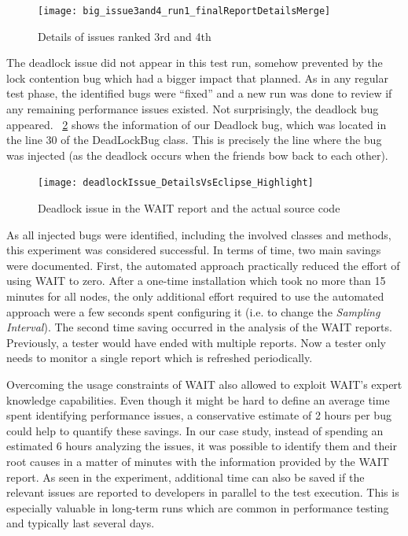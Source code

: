 \documentclass[runningheads,a4paper]{llncs}
\begin{document}
\begin{figure}[!h]
\centering
\texttt{[image: big\_issue3and4\_run1\_finalReportDetailsMerge]}
\caption{Details of issues ranked 3rd and 4th}
\label{fig_issues34}
\end{figure}

The deadlock issue did not appear in this test run, somehow prevented by the
lock contention bug which had a bigger impact that planned. As in any regular
test phase, the identified bugs were ``fixed'' and a new run was done to review
if any remaining performance issues existed. Not surprisingly, the deadlock bug
appeared. \figurename ~\ref{fig_dlissue_vs_code} shows the information of our
Deadlock bug, which was located in the line 30 of the DeadLockBug class. This is
precisely the line where the bug was injected (as the deadlock occurs when the
friends bow back to each other).
\begin{figure}[!h]
\centering
\texttt{[image: deadlockIssue\_DetailsVsEclipse\_Highlight]}
\caption{Deadlock issue in the WAIT report and the actual source code}
\label{fig_dlissue_vs_code}
\end{figure}

As all injected bugs were identified, including the involved classes and
methods, this experiment was considered successful. In terms of time, two main
savings were documented. First, the automated approach practically reduced the
effort of using WAIT to zero. After a one-time installation which took no more
than 15 minutes for all nodes, the only additional effort required to use the
automated approach were a few seconds spent configuring it (i.e. to change the
\emph{Sampling Interval}). The second time saving occurred in the analysis of the 
WAIT reports. Previously, a tester would have ended with multiple reports. Now a 
tester only needs to monitor a single report which is refreshed periodically.

Overcoming the usage constraints of WAIT also allowed to exploit
WAIT's expert knowledge capabilities. Even though it might be hard to define an
average time spent identifying performance issues, a conservative estimate of
2 hours per bug could help to quantify these savings. In our case study,
instead of spending an estimated 6 hours analyzing the issues, it was
possible to identify them and their root causes in a matter of minutes with the 
information provided by the WAIT report. As seen in the experiment, additional
time can also be saved if the relevant issues are reported to developers in parallel to
the test execution. This is especially valuable in long-term runs which
are common in performance testing and typically last several days.
\end{document}
